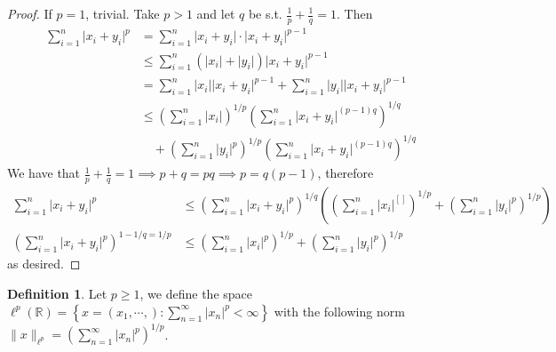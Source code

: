 \documentclass[11pt,a4paper]{article}
\theoremstyle{definition}
\newtheorem{definition}{Definition}[section]
\theoremstyle{plain}
\theoremstyle{remark}
\newcommand{\R}{\mathbb{R}}
\renewcommand{\set}[1]{\left\{ #1 \right\}}
\newcommand{\abs}[1]{\lvert #1 \rvert}
\newcommand{\norm}[1]{\lVert #1 \rVert}
\newcommand{\1}{\mathbbm{1}}
\begin{document}
\begin{proof}
    If $p =1$, trivial. Take $p > 1$ and let $q$ be s.t. $\frac{1}{p} + \frac{1}{q} = 1$. Then 
    \begin{align*}
        \sum_{i=1}^n \abs{x_i + y_i}^p &= \sum_{i=1}^n \abs{x_i + y_i} \cdot \abs{x_i + y_i}^{p-1} \\
        &\le \sum_{i=1}^n \left(\abs{x_i} + \abs{y_i}\right) \abs{x_i + y_i}^{p-1} \\
        &= \sum_{i=1}^n \abs{x_i} \abs{x_i + y_i}^{p-1} + \sum_{i=1}^n \abs{y_i} \abs{x_i + y_i}^{p-1} \\
        &\le \left(\sum_{i=1}^n \abs{x_i}\right)^{1/p} \left(\sum_{i=1}^n \abs{x_i + y_i}^{(p-1)q}\right)^{1/q} \\
        &\quad + \left(\sum_{i=1}^n \abs{y_i}^p\right)^{1/p} \left(\sum_{i=1}^n \abs{x_i + y_i}^{(p-1)q}\right)^{1/q} 
    \end{align*}
    We have that $\frac{1}{p} + \frac{1}{q} = 1 \implies p+q = pq \implies p = q(p-1)$, therefore 
    \begin{align*}
        \sum_{i=1}^n \abs{x_i + y_i}^p &\le \left(\sum_{i=1}^n \abs{x_i + y_i}^p\right)^{1/q} \left(\left(\sum_{i=1}^n \abs{x_i}^[]\right)^{1/p} + \left(\sum_{i=1}^n \abs{y_i}^p\right)^{1/p}\right) \\
        (\sum_{i=1}^n \abs{x_i + y_i}^p)^{1-1/q = 1/p} &\le \left( \sum_{i=1}^n \abs{x_i}^p\right)^{1/p} + \left(\sum_{i=1}^n \abs{y_i}^p\right)^{1/p}
    \end{align*}
    as desired.
\end{proof}

\begin{definition}
    Let $p \ge 1$, we define the space $\ell^p(\R) = \set{x = (x_1 ,\cdots, ) \colon \sum_{n=1}^\infty \abs{x_n}^p < \infty}$ with the following norm 
    $\norm{x}_{\ell^p} = \left(\sum_{n=1}^\infty \abs{x_n}^p\right)^{1/p}$. 
\end{definition}
\end{document}
